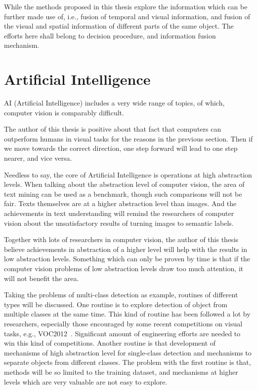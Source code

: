While the methods proposed in this thesis explore the information which can be further made use of, i.e., fusion of temporal and visual information, and fusion of the visual and spatial information of different parts of the same object. The efforts here shall belong to decision procedure, and information fusion mechanism.

\section{Artificial Intelligence}
AI (Artificial Intelligence) includes a very wide range of topics, of which, computer vision is comparably difficult.

The author of this thesis is positive about that fact that computers can outperform humans in visual tasks for the reasons in the previous section. Then if we move towards the correct direction, one step forward will lead to one step nearer, and vice versa.

Needless to say, the core of Artificial Intelligence is operations at high abstraction levels. When talking about the abstraction level of computer vision, the area of text mining can be used as a benchmark, though such comparisons will not be fair. Texts themselves are at a higher abstraction level than images. And the achievements in text understanding will remind the researchers of computer vision about the unsatisfactory results of turning images to semantic labels.

Together with lots of researchers in computer vision, the author of this thesis believe achievements in abstraction of a higher level will help with the results in low abstraction levels. Something which can only be proven by time is that if the computer vision problems of low abstraction levels draw too much attention, it will not benefit the area.


Taking the problems of multi-class detection as example, routines of different types will be discussed. One routine is to explore detection of object from multiple classes at the same time. This kind of routine has been followed a lot by researchers, especially those encouraged by some recent competitions on visual tasks, e.g., VOC2012~\citep{voc}. Significant amount of engineering efforts are needed to win this kind of competitions. Another routine is that
development of mechanisms of high abstraction level for single-class detection and mechanisms to separate objects from different classes. The problem with the first routine is that, methods will be so limited to the training dataset, and mechanisms at higher levels which are very valuable are not easy to explore.

